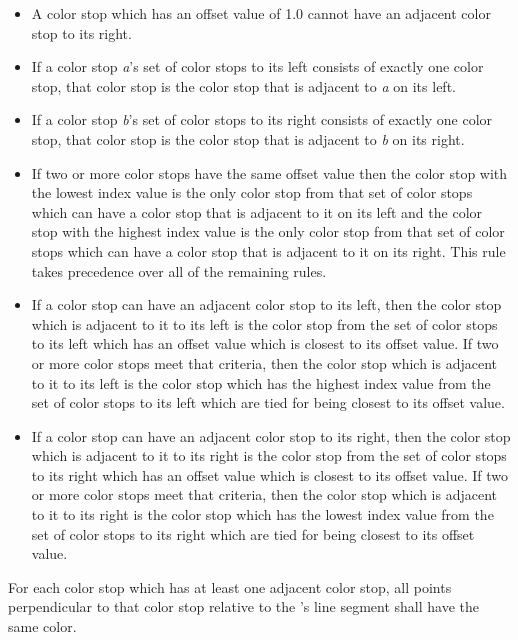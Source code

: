 \begin{itemize}
\item A color stop which has an offset value of 1.0 cannot have an adjacent color stop to its right.

\item If a color stop \textit{a}'s set of color stops to its left consists of exactly one color stop, that color stop is the color stop that is adjacent to \textit{a} on its left.

\item If a color stop \textit{b}'s set of color stops to its right consists of exactly one color stop, that color stop is the color stop that is adjacent to \textit{b} on its right.

\item If two or more color stops have the same offset value then the color stop with the lowest index value is the only color stop from that set of color stops which can have a color stop that is adjacent to it on its left and the color stop with the highest index value is the only color stop from that set of color stops which can have a color stop that is adjacent to it on its right. This rule takes precedence over all of the remaining rules.

\item If a color stop can have an adjacent color stop to its left, then the color stop which is adjacent to it to its left is the color stop from the set of color stops to its left which has an offset value which is closest to its offset value. If two or more color stops meet that criteria, then the color stop which is adjacent to it to its left is the color stop which has the highest index value from the set of color stops to its left which are tied for being closest to its offset value.

\item If a color stop can have an adjacent color stop to its right, then the color stop which is adjacent to it to its right is the color stop from the set of color stops to its right which has an offset value which is closest to its offset value. If two or more color stops meet that criteria, then the color stop which is adjacent to it to its right is the color stop which has the lowest index value from the set of color stops to its right which are tied for being closest to its offset value.
\end{itemize}

\pnum
For each color stop which has at least one adjacent color stop, all points perpendicular to that color stop relative to the 's line segment shall have the same color.

